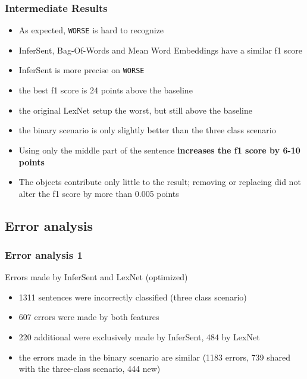 \documentclass[11pt,aspectratio=169,usenames,dvipsnames]{beamer}
\begin{document}
    \begin{frame}[t]
        \frametitle{Intermediate Results}
        \begin{itemize}
            \item As expected, \texttt{WORSE} is hard to recognize
            \item InferSent, Bag-Of-Words and Mean Word Embeddings have a similar f1 score
            \item InferSent is more precise on \texttt{WORSE}\pause
            \item the best f1 score is 24 points above the baseline
            \item the original LexNet setup the worst, but still above the baseline
            \item the binary scenario is only slightly better than the three class scenario\pause
            \item Using only the middle part of the sentence \textbf{increases the f1 score by 6-10 points}
            \item The objects contribute only little to the result; removing or replacing did not alter the f1 score by more than 0.005 points
        \end{itemize}
    \end{frame}

    \subsection{Error analysis}
    \begin{frame}[t]
        \frametitle{Error analysis 1}
        Errors made by InferSent and LexNet (optimized)
        \begin{itemize}
            \item<1> 1311 sentences were incorrectly classified (three class scenario)
            \item<1> 607 errors were made by both features
            \item<1> 220 additional were exclusively made by InferSent, 484 by LexNet
            \item<1> the errors made in the binary scenario are similar (1183 errors, 739 shared with the three-class scenario, 444 new)
           
        \end{itemize}

    \end{frame}
    
\end{document}
